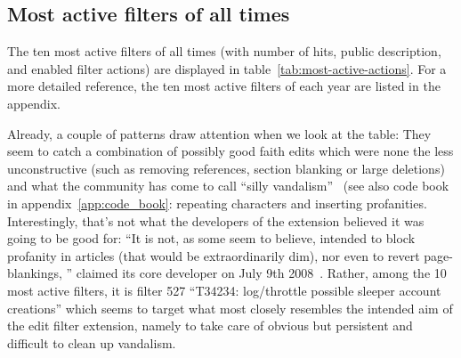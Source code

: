 \subsection{Most active filters of all times}
The ten most active filters of all times (with number of hits, public description, and enabled filter actions) are displayed in table~\ref{tab:most-active-actions}.
For a more detailed reference, the ten most active filters of each year are listed in the appendix. %

Already, a couple of patterns draw attention when we look at the table:
They seem to catch a combination of possibly good faith edits which were none the less unconstructive (such as removing references, section blanking or large deletions)
and what the community has come to call ``silly vandalism''~\cite{Wikipedia:VandalismTypes} (see also code book in appendix~\ref{app:code_book}: repeating characters and inserting profanities.
Interestingly, that's not what the developers of the extension believed it was going to be good for:
``It is not, as some seem to believe, intended to block profanity in articles (that would be extraordinarily dim), nor even to revert page-blankings, '' claimed its core developer on July 9th 2008~\cite{Wikipedia:EditFilterTalkArchive1Clarification}.
Rather, among the 10 most active filters, it is filter 527 ``T34234: log/throttle possible sleeper account creations'' which seems to target what most closely resembles the intended aim of the edit filter extension, namely to take care of obvious but persistent and difficult to clean up vandalism.

